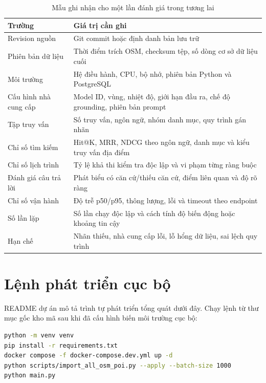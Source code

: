 \begin{table}[htbp]
    \centering
    \caption{Mẫu ghi nhận cho một lần đánh giá trong tương lai}
    \label{tab:evaluation_record}
    \renewcommand{\arraystretch}{1.3}
    \begin{tabularx}{\textwidth}{>{\raggedright\arraybackslash}p{4.0cm} X}
        \toprule
        \textbf{Trường} & \textbf{Giá trị cần ghi} \\
        \midrule
        Revision nguồn & Git commit hoặc định danh bản lưu trữ \\
        Phiên bản dữ liệu & Thời điểm trích OSM, checksum tệp, số dòng cơ sở dữ liệu cuối \\
        Môi trường & Hệ điều hành, CPU, bộ nhớ, phiên bản Python và PostgreSQL \\
        Cấu hình nhà cung cấp & Model ID, vùng, nhiệt độ, giới hạn đầu ra, chế độ grounding, phiên bản prompt \\
        Tập truy vấn & Số truy vấn, ngôn ngữ, nhóm danh mục, quy trình gán nhãn \\
        Chỉ số tìm kiếm & Hit@K, MRR, NDCG theo ngôn ngữ, danh mục và kiểu truy vấn địa điểm \\
        Chỉ số lịch trình & Tỷ lệ khả thi kiểm tra độc lập và vi phạm từng ràng buộc \\
        Đánh giá câu trả lời & Phát biểu có căn cứ/thiếu căn cứ, điểm liên quan và độ rõ ràng \\
        Chỉ số vận hành & Độ trễ p50/p95, thông lượng, lỗi và timeout theo endpoint \\
        Số lần lặp & Số lần chạy độc lập và cách tính độ biến động hoặc khoảng tin cậy \\
        Hạn chế & Nhãn thiếu, nhà cung cấp lỗi, lỗ hổng dữ liệu, sai lệch quy trình \\
        \bottomrule
    \end{tabularx}
\end{table}

\section{Lệnh phát triển cục bộ}

README dự án mô tả trình tự phát triển tổng quát dưới đây. Chạy lệnh từ thư mục gốc kho mã sau khi đã cấu hình biến môi trường cục bộ:

\begin{lstlisting}[language=bash,caption={Trình tự phát triển cục bộ được dự án mô tả}]
python -m venv venv
pip install -r requirements.txt
docker compose -f docker-compose.dev.yml up -d
python scripts/import_all_osm_poi.py --apply --batch-size 1000
python main.py
\end{lstlisting}

